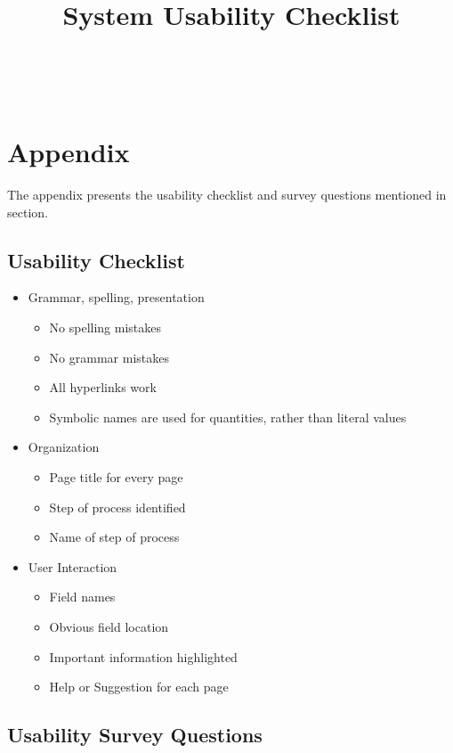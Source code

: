 \documentclass[12pt, titlepage]{article}
\begin{document}



~\newpage

\newpage

\section{Appendix}

The appendix presents the usability checklist and survey questions mentioned in 
section.

\subsection{Usability Checklist}


\title{System Usability Checklist}


\begin{itemize}
  
\item Grammar, spelling, presentation
  \begin{itemize}
  \item No spelling mistakes 
  \item No grammar mistakes
  \item All hyperlinks work
  \item Symbolic names are used for quantities, rather than literal values
  \end{itemize}

\item Organization
  \begin{itemize}
  \item Page title for every page
  \item Step of process identified
  \item Name of step of process
  \end{itemize}
  
\item User Interaction
  \begin{itemize}
  \item Field names 
  \item Obvious field location 
  \item Important information highlighted
  \item Help or Suggestion for each page
  \end{itemize}
\end{itemize}


\subsection{Usability Survey Questions}
\end{document}
